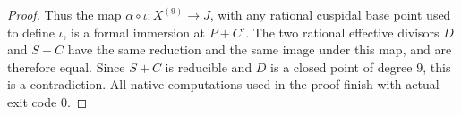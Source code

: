 \begin{proof}
Thus the map $\alpha\circ\iota:X^{(9)}\to J$, with any rational
cuspidal base point used to define $\iota$, is a formal immersion
at $P+C'$. The two rational effective divisors $D$ and $S+C$ have
the same reduction and the same image under this map, and are
therefore equal. Since $S+C$ is reducible and $D$ is a closed
point of degree $9$, this is a contradiction. All native
computations used in the proof finish with actual exit code $0$.
\end{proof}
